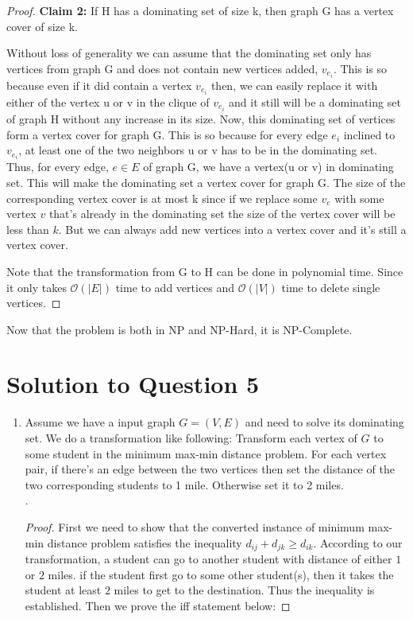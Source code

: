 \documentclass[11pt]{article}
\renewcommand{\O}{\mathcal{O}}
\begin{document}
\begin{enumerate}
\begin{proof}
			{\bf Claim 2:} If H has a dominating set of size k, then graph G has a vertex cover of size k.

			Without loss of generality we can assume that the dominating set only has vertices from graph G and does not contain new vertices added, $v_{e_i}$. This is so because even if it did contain a vertex $v_{e_i}$ then, we can easily replace it with either of the vertex u or v in the clique of $v_{e_i}$ and it still will be a dominating set of graph H without any increase in its size. Now, this dominating set of vertices form a vertex cover for graph G. This is so because for every edge $e_i$ inclined to $v_{e_i}$, at least one of the two neighbors u or v has to be in the dominating set. Thus, for every edge, $e \in E$ of graph G, we have a vertex(u or v) in dominating set. This will make the dominating set a vertex cover for graph G. The size of the corresponding vertex cover is at most k since if we replace some $v_e$ with some vertex $v$ that's already in the dominating set the size of the vertex cover will be less than $k$. But we can always add new vertices into a vertex cover and it's still a vertex cover.
			
			Note that the transformation from G to H can be done in polynomial time.
			Since it only takes $\O(|E|)$ time to add vertices and $\O(|V|)$ time to delete single vertices.
		\end{proof}
Now that the problem is both in NP and NP-Hard, it is NP-Complete.

\newpage
\section{Solution to Question 5} 

\begin{enumerate}[(1)]
  \item Assume we have a input graph $G = (V, E)$ and need to solve its dominating set.
We do a transformation like following: Transform each vertex of $G$ to some student in the minimum max-min distance problem.
For each vertex pair, if there's an edge between the two vertices then set the distance of the two corresponding students to 1 mile.
Otherwise set it to 2 miles. \\

.
\begin{proof}
	First we need to show that the converted instance of minimum max-min distance problem satisfies the inequality $d_{ij} + d_{jk} \geq d_{ik}$.
	According to our transformation, a student can go to another student with distance of either $1$ or $2$ miles.
	if the student first go to some other student(s), then it takes the student at least $2$ miles to get to the destination.
	Thus the inequality is established.
	Then we prove the iff statement below:


\end{proof}
\end{enumerate}
\end{enumerate}
\end{document}
